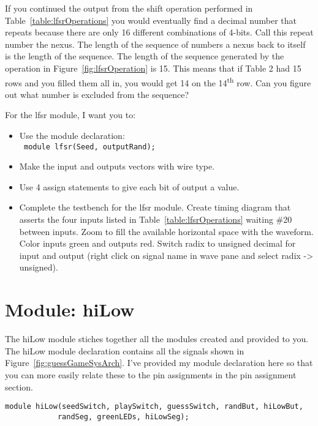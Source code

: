 If you continued the output from the shift operation performed in Table~\ref{table:lfsrOperations} 
you would eventually find a decimal number that repeats because there
are only 16 different combinations of 4-bits. Call this repeat number
the nexus. The length of the sequence of numbers a nexus back to itself
is the length of the sequence. The length of the sequence generated by
the operation in Figure~\ref{fig:lfsrOperation} is 15. This means that if Table 2 had 15 rows
and you filled them all in, you would get 14 on the
14\textsuperscript{th} row. Can you figure out what number is excluded
from the sequence?

For the lfsr module, I want you to:

\begin{itemize}
\item
  Use the module declaration:\\
\verb+ module lfsr(Seed, outputRand);+

\item
  Make the input and outputs vectors with wire type.
\item
  \protect\hypertarget{lfsr_verilog}{}{}Use 4 assign statements to give
  each bit of output a value.
\item
  \protect\hypertarget{lfsr_testbench}{}{}Complete the testbench for the
  lfsr module. Create timing diagram that asserts the four inputs listed
  in Table~\ref{table:lfsrOperations} 
  waiting \#20 between inputs. Zoom to fill the available
  horizontal space with the waveform. Color inputs green and outputs
  red. Switch radix to unsigned decimal for input and output (right
  click on signal name in wave pane and select radix -\textgreater{}
  unsigned).
\end{itemize}

\section{Module: hiLow}

The hiLow module stiches together all the modules created and provided
to you. The hiLow module declaration contains all the signals shown in
Figure~\ref{fig:guessGameSysArch}. I've provided my module declaration here so that you can more
easily relate these to the pin assignments in the pin assignment
section.

\begin{verbatim}
module hiLow(seedSwitch, playSwitch, guessSwitch, randBut, hiLowBut,
			randSeg, greenLEDs, hiLowSeg);
\end{verbatim}

